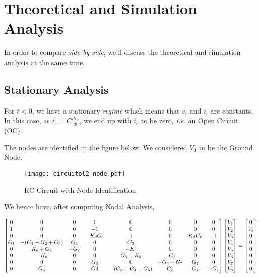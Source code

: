 \section{Theoretical and Simulation Analysis}
\label{sec:analysis}

In order to compare \textit{side by side}, we'll discuss the theoretical and simulation analysis at the same time.

\subsection{Stationary Analysis}
\label{subsec:stat}

For $t<0$, we have a stationary \textit{regime} which means that $v_i$ and $i_i$ are constants. In this case, as $i_c=C\frac{dv_c}{dt}$, we end up with $i_c$ to be zero, \textit{i.e.} an Open Circuit (OC).

The nodes are identified in the figure below. We considered $V_4$ to be the Ground Node.

\begin{figure}[h]
    \centering
    \texttt{[image: circuitol2\_node.pdf]}
    \caption{RC Circuit with Node Identification}
    \label{fig:theorical_nodal_analysis}
\end{figure}

We hence have, after computing Nodal Analysis, 

\begin{equation} \nonumber
\label{eq:node}
\centering
\begin{bmatrix}
0 & 0 & 0 & 1 & 0 & 0 & 0 & 0 \\
1 & 0 & 0 & -1 & 0 & 0 & 0 & 0 \\
0 & 0 & 0 & -K_dG_6 & 1 & 0 & K_dG_6 & -1\\
G_1 & -(G_1+G_2+G_3) & G_2 & 0 & G_3 & 0 & 0 & 0  \\
0 & K_b+G_2 & -G_2 & 0 & -K_b & 0 & 0 & 0 \\
0 & -K_b & 0 & 0 & G_5+K_b & -G_5 & 0 & 0 \\
0 & 0 & 0 & G_6 & 0 & -G_6-G_7 & G_7 & 0 \\
0 & G_3 & 0 & G4 & -(G_3+G_4+G_5) & G_5 & G_7 & -G_7
\end{bmatrix}
\begin{bmatrix}
V_1 \\
V_2 \\
V_3 \\
V_4 \\
V_5 \\
V_6 \\
V_7 \\
V_8 \\
\end{bmatrix}
=
\begin{bmatrix}
0 \\
V_s \\
0 \\
0 \\ 
0 \\
0 \\
0 \\
0
\end{bmatrix}
\end{equation}

